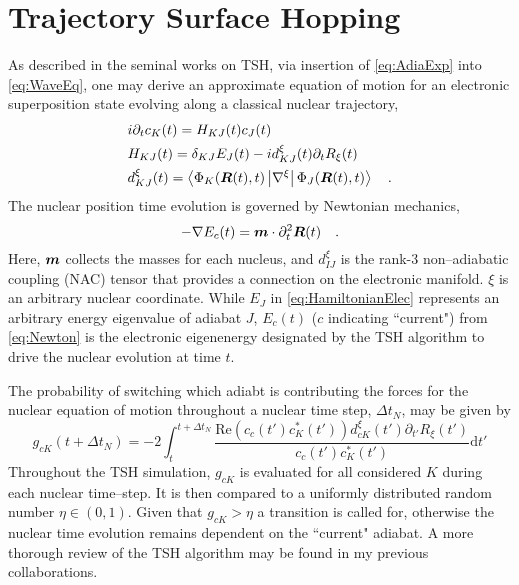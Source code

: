 \section{Trajectory Surface Hopping}
\label{sec:TSH}

As described in the seminal works on TSH\cite{Tully98_407, Tully90_1061}, via
insertion of \cref{eq:AdiaExp} into \cref{eq:WaveEq}, one may derive an
approximate equation of motion for an electronic superposition state evolving
along a classical nuclear trajectory,
\begin{align}
  &i  \partial_t c_K(t) = H_{KJ}(t) c_J(t) \label{eq:EOMCs} \\
  &H_{KJ}(t) = \delta_{KJ}E_J(t) - i d_{KJ}^\xi (t) \partial_t R_{\xi}(t) \label{eq:HamiltonianElec} \\
  &d_{KJ}^\xi (t) = \left\langle \Phi_K(\boldsymbol{R}(t),t) \left\vert \nabla^\xi \right\vert \Phi_J(\boldsymbol{R}(t),t) \right\rangle \label{eq:NAC}
  \quad .
\end{align}
The nuclear position time evolution is governed by Newtonian mechanics,
\begin{equation}
  -\nabla E_c(t) = \boldsymbol{m}\cdot \partial_t^2\boldsymbol{R}(t) \label{eq:Newton}
  \quad.
\end{equation}
Here, $\boldsymbol{m}$ collects the masses for each nucleus, and $d_{IJ}^\xi$ is the
rank-3 non--adiabatic coupling (NAC) tensor that provides a connection on the
electronic manifold.  $\xi$ is an arbitrary nuclear coordinate.  While $E_J$ in
\cref{eq:HamiltonianElec} represents an arbitrary energy eigenvalue of adiabat
$J$, $E_c(t)$ ($c$ indicating ``current") from \cref{eq:Newton} is the
electronic eigenenergy designated by the TSH algorithm to drive the nuclear
evolution at time $t$.  

The probability of switching which adiabt is contributing the forces for the
nuclear equation of motion throughout a nuclear time step, $\Delta t_N$, may be
given by
\begin{equation}
g_{cK}(t + \Delta t_N) = -2 \int_t^{t + \Delta t_N} 
  \frac{\mathrm{Re}(c_c(t') c^*_K(t'))d_{cK}^\xi (t') \partial_{t'}
  R_{\xi}(t')}{c_c(t') c^*_K(t')}\mathrm{d}t'
\end{equation}
Throughout the TSH simulation, $g_{cK}$ is evaluated for all considered $K$
during each nuclear time--step. It is then compared to a uniformly distributed
random number $\eta \in (0,1)$. Given that $g_{cK} > \eta$ a transition is
called for, otherwise the nuclear time evolution remains dependent on the
``current" adiabat. A more thorough review of the TSH algorithm may be found in
my previous collaborations\cite{DBWY16_JCTC935}.

